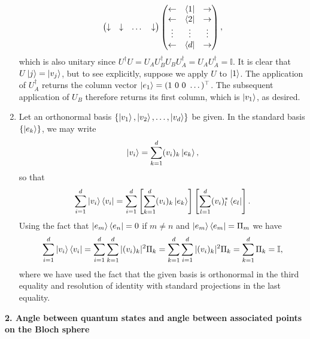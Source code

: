 \documentclass{article}
\theoremstyle{definition}
\newcommand{\lb}{\left[}
\newcommand{\rb}{\right]}
\begin{document}
\begin{enumerate}[label=(\alph*)]
\begin{align*}
\begin{pmatrix}
			\downarrow& \downarrow& \dots&\downarrow 
		\end{pmatrix} 
	\begin{pmatrix}
		\leftarrow & \bra{1} &\rightarrow \\
		\leftarrow & \bra{2} &\rightarrow \\
		\vdots & \vdots &\vdots \\
		\leftarrow & \bra{d} &\rightarrow 
	\end{pmatrix},
	\end{align*}
	which is also unitary since $U^\dagger U = U_A U_B^\dagger U_B U_A^\dagger = U_AU_A^\dagger = \mathbb{I}$. It is clear that $U\ket{j} = \ket{v_j}$, but to see explicitly, suppose we apply $U$ to $\ket{1}$. The application of $U_A^\dagger$ returns the column vector $\ket{e_1} = (1\,\, 0 \,\,0 \,\, \dots)^\top$. The subsequent application of $U_B$ therefore returns its first column, which is $\ket{v_1}$, as desired. 

	
	
	\item Let an orthonormal basis $\{ \ket{v_1},\ket{v_2},\dots,\ket{v_d} \}$ be given. In the standard basis $\{\ket{e_k}\}$, we may write
	\begin{align*}
		\ket{v_i} = \sum_{k=1}^d (v_i)_k \ket{e_k},
	\end{align*}
	so that
	\begin{align*}
		\sum_{i=1}^d \ket{v_i} \bra{v_i} = \sum_{i=1}^d \lb \sum_{k=1}^d (v_i)_k \ket{e_k}  \rb \lb \sum_{l=1}^d (v_i)^*_l \bra{e_l} \rb. 
	\end{align*}
	Using the fact that $\ket{e_m}\bra{e_n} = 0$ if $m\neq n$ and $\ket{e_m}\bra{e_m} = \Pi_m$ we have
	\begin{align*}
		\sum_{i=1}^d \ket{v_i} \bra{v_i} = \sum_{i=1}^d \sum_{k=1}^d  |(v_i)_k|^2 \Pi_k = \sum_{k=1}^d \sum_{i=1}^d  |(v_i)_k|^2 \Pi_k = \sum_{k=1}^d\Pi_k = \mathbb{I},
	\end{align*}
	where we have used the fact that the given basis is orthonormal in the third equality and resolution of identity with standard projections in the last equality. 
	
\end{enumerate}



\noindent \textbf{2. Angle between quantum states and angle between associated points on the Bloch sphere} 
\end{document}
